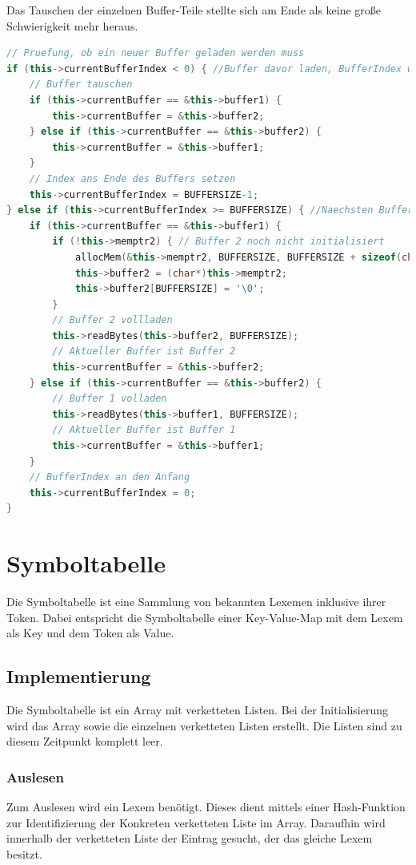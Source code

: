 \documentclass[listof=totoc,DIV11,a4paper]{scrreprt}
\begin{document}
Das Tauschen der einzelnen Buffer-Teile stellte sich am Ende als keine große Schwierigkeit mehr heraus.

\begin{lstlisting}[language=C++,label=lst:buffertausch,caption=Buffer: Tauschen der Buffer-Teile]
// Pruefung, ob ein neuer Buffer geladen werden muss
if (this->currentBufferIndex < 0) { //Buffer davor laden, BufferIndex wuerde sonst negativ werden
	// Buffer tauschen
	if (this->currentBuffer == &this->buffer1) {
		this->currentBuffer = &this->buffer2;
	} else if (this->currentBuffer == &this->buffer2) {
		this->currentBuffer = &this->buffer1;
	}
	// Index ans Ende des Buffers setzen
	this->currentBufferIndex = BUFFERSIZE-1;
} else if (this->currentBufferIndex >= BUFFERSIZE) { //Naechsten Buffer laden, BufferIndex wuerde sonst ueberlaufen
	if (this->currentBuffer == &this->buffer1) {
		if (!this->memptr2) { // Buffer 2 noch nicht initialisiert
			allocMem(&this->memptr2, BUFFERSIZE, BUFFERSIZE + sizeof(char));
			this->buffer2 = (char*)this->memptr2;
			this->buffer2[BUFFERSIZE] = '\0';
		}
		// Buffer 2 vollladen
		this->readBytes(this->buffer2, BUFFERSIZE);
		// Aktueller Buffer ist Buffer 2
		this->currentBuffer = &this->buffer2;
	} else if (this->currentBuffer == &this->buffer2) {
		// Buffer 1 volladen
		this->readBytes(this->buffer1, BUFFERSIZE);
		// Aktueller Buffer ist Buffer 1
		this->currentBuffer = &this->buffer1;
	}
	// BufferIndex an den Anfang
	this->currentBufferIndex = 0;
}
\end{lstlisting}

\section{Symboltabelle}\label{sec:symtable}
Die Symboltabelle ist eine Sammlung von bekannten Lexemen inklusive ihrer Token. Dabei entspricht die Symboltabelle einer Key-Value-Map mit dem Lexem als Key und dem Token als Value.

\subsection{Implementierung}
Die Symboltabelle ist ein Array mit verketteten Listen. Bei der Initialisierung wird das Array sowie die einzelnen verketteten Listen erstellt.
Die Listen sind zu diesem Zeitpunkt komplett leer.

\subsubsection{Auslesen}
Zum Auslesen wird ein Lexem benötigt. Dieses dient mittels einer Hash-Funktion zur Identifizierung der Konkreten verketteten Liste im Array.
Daraufhin wird innerhalb der verketteten Liste der Eintrag gesucht, der das gleiche Lexem besitzt.
\end{document}
